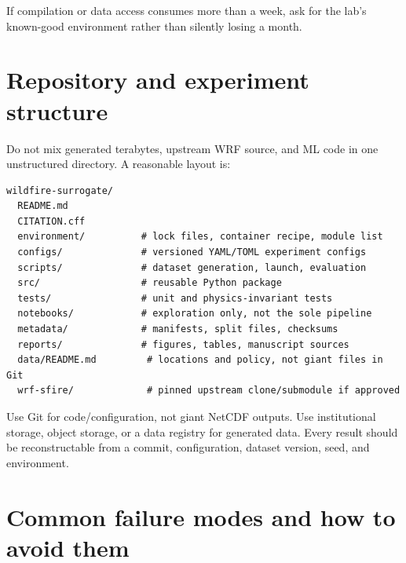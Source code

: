 \documentclass[11pt]{article}
\begin{document}
If compilation or data access consumes more than a week, ask for the lab's known-good environment rather than silently losing a month.

\section{Repository and experiment structure}

Do not mix generated terabytes, upstream WRF source, and ML code in one unstructured directory. A reasonable layout is:

\begin{lstlisting}[caption={Suggested project organization}]
wildfire-surrogate/
  README.md
  CITATION.cff
  environment/          # lock files, container recipe, module list
  configs/              # versioned YAML/TOML experiment configs
  scripts/              # dataset generation, launch, evaluation
  src/                  # reusable Python package
  tests/                # unit and physics-invariant tests
  notebooks/            # exploration only, not the sole pipeline
  metadata/             # manifests, split files, checksums
  reports/              # figures, tables, manuscript sources
  data/README.md         # locations and policy, not giant files in Git
  wrf-sfire/             # pinned upstream clone/submodule if approved
\end{lstlisting}

Use Git for code/configuration, not giant NetCDF outputs. Use institutional storage, object storage, or a data registry for generated data. Every result should be reconstructable from a commit, configuration, dataset version, seed, and environment.

\section{Common failure modes and how to avoid them}
\end{document}
